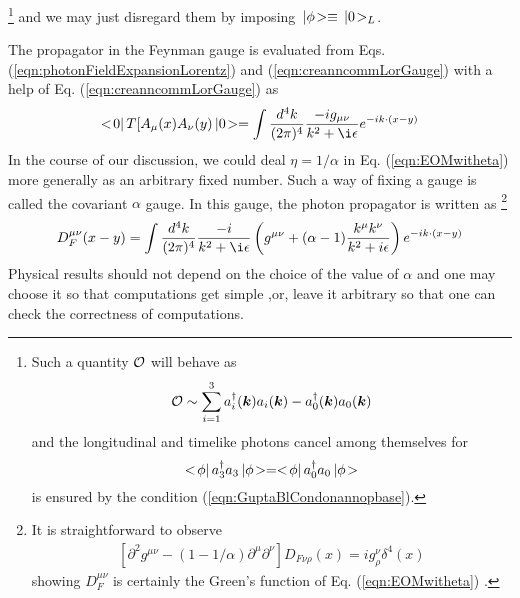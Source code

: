 \footnote{%
Such a quantity ${\cal O}$ will behave as
\begin{eqnarray*}
{\cal O} \sim \sum_{i = 1}^3 a^\dagger_i(\mbox{\boldmath $k$}) a_i(\mbox{\boldmath $k$})
-
a^\dagger_0(\mbox{\boldmath $k$}) a_0(\mbox{\boldmath $k$})
\end{eqnarray*}
and the longitudinal and timelike photons cancel among themselves
for 
\[<\! \phi |\, a_3^\dagger a_3 \,| \phi \!>
=<\! \phi |\, a_0^\dagger a_0 \,| \phi \!>
\]
is ensured by the condition (\ref{eqn:GuptaBlCondonannopbase}).
}%
 and we may just disregard
them by imposing $\,| \phi \!> \equiv \,| 0 \!>_L$.

The propagator in the Feynman gauge is evaluated from
Eqs. (\ref{eqn:photonFieldExpansionLorentz}) and (\ref{eqn:creanncommLorGauge})
with a help of Eq. (\ref{eqn:creanncommLorGauge}) as
\begin{eqnarray}
\bra 0 \braend
T[
A_\mu (x) A_\nu (y)
\ketend 0 \ket
=
\int
\frac{d^4 k}{(2\pi)^4}
\frac{-i g_{\mu \nu}}
{k^2 + \i\epsilon}
e^{-ik \cdot (x - y)}
\label{eqn:photonProp}
\end{eqnarray}
In the course of our discussion, we could deal $\eta = 1/\alpha$ 
in Eq. (\ref{eqn:EOMwitheta}) more generally as an arbitrary fixed number.
Such a way of fixing a gauge is called the covariant  $\alpha$ gauge.
In this gauge, the photon propagator is written as
\footnote{%
It is straightforward to observe
\begin{eqnarray}
\left[
\partial^2 g^{\mu \nu} - \left(
1 - 1/\alpha \right)
\partial^\mu \partial^\nu
\right]
D_{F\nu \rho}(x)
= i g^\nu_{\!\rho} \delta^4(x) 
\end{eqnarray}
showing $D_F^{\mu \nu}$ is certainly the Green's function of 
Eq. (\ref{eqn:EOMwitheta}) .
}%
\begin{eqnarray}
D_F^{\mu \nu}(x - y)
=
\int
\frac{d^4 k}{(2\pi)^4}
\frac{-i}
{k^2 + \i\epsilon}
\left(
g^{\mu \nu} + (\alpha - 1)
\frac{k^\mu k^\nu}{k^2+ i\epsilon}
\right)
e^{-ik \cdot (x - y)}
\label{eqn:photonPropalpha}
\end{eqnarray}
Physical results should not depend on the choice of the value of $\alpha$
and one may choose it so that computations get simple
,or, leave it arbitrary so that  one can check the correctness of computations.
